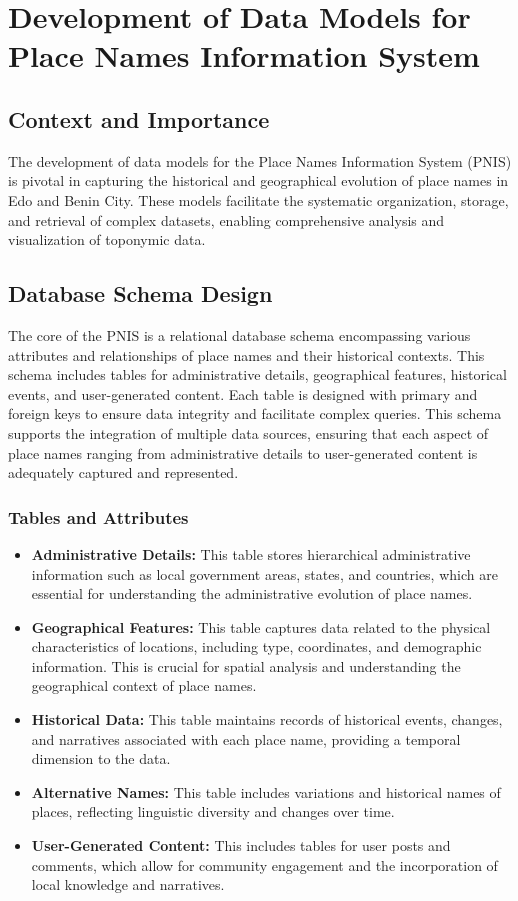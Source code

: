 \section{Development of Data Models for Place Names Information System}

\subsection{Context and Importance}
The development of data models for the Place Names Information System (PNIS) is pivotal in capturing the historical and geographical evolution of place names in Edo and Benin City. These models facilitate the systematic organization, storage, and retrieval of complex datasets, enabling comprehensive analysis and visualization of toponymic data.

\subsection{Database Schema Design}
The core of the PNIS is a relational database schema encompassing various attributes and relationships of place names and their historical contexts. This schema includes tables for administrative details, geographical features, historical events, and user-generated content. Each table is designed with primary and foreign keys to ensure data integrity and facilitate complex queries. This schema supports the integration of multiple data sources, ensuring that each aspect of place names ranging from administrative details to user-generated content is adequately captured and represented.

\subsubsection{Tables and Attributes}
\begin{itemize}
    \item \textbf{Administrative Details:} This table stores hierarchical administrative information such as local government areas, states, and countries, which are essential for understanding the administrative evolution of place names.
    \item \textbf{Geographical Features:} This table captures data related to the physical characteristics of locations, including type, coordinates, and demographic information. This is crucial for spatial analysis and understanding the geographical context of place names.
    \item \textbf{Historical Data:} This table maintains records of historical events, changes, and narratives associated with each place name, providing a temporal dimension to the data.
    \item \textbf{Alternative Names:} This table includes variations and historical names of places, reflecting linguistic diversity and changes over time.
    \item \textbf{User-Generated Content:} This includes tables for user posts and comments, which allow for community engagement and the incorporation of local knowledge and narratives.
\end{itemize}

